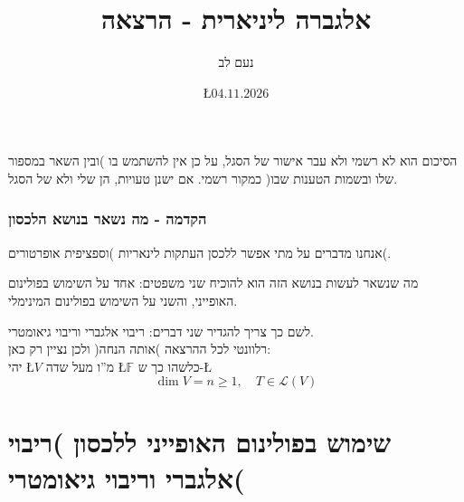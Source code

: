 \documentclass[english,hebrew]{article}
\begin{document}
\title{אלגברה ליניארית {\endL} - הרצאה {\endL}}
\author{נעם לב}
\date{\L{$04.11.2026$}}

\maketitle
\noindent{}
\begin{center}
הסיכום הוא לא רשמי ולא עבר אישור של הסגל, על כן אין להשתמש בו )ובין
השאר במספור שלו ובשמות הטענות שבו( כמקור רשמי. אם ישנן טעויות, הן
שלי ולא של הסגל.
\par\end{center}

\medskip{}

\tableofcontents{}

\newpage{}

\section{הקדמה - מה נשאר בנושא הלכסון}

אנחנו מדברים על מתי אפשר ללכסן העתקות לינאריות )וספציפית אופרטורים(.

מה שנשאר לעשות בנושא הזה הוא להוכיח שני משפטים: אחד על השימוש בפולינום
האופייני, והשני על השימוש בפולינום המינימלי.

לשם כך צריך להגדיר שני דברים: ריבוי אלגברי וריבוי גיאומטרי.\\

רלוונטי לכל ההרצאה )אותה הנחה( ולכן נציין רק כאן: \\

יהי \L{$V$} מ\textquotedblright ו מעל שדה \L{$\mathbb{F}$} כלשהו
כך ש-\L{%
\[
\dim V=n\geq1,\quad T\in\mathcal{L}(V)
\]
}%

\part{שימוש בפולינום האופייני ללכסון )ריבוי אלגברי וריבוי גיאומטרי(}
\end{document}
